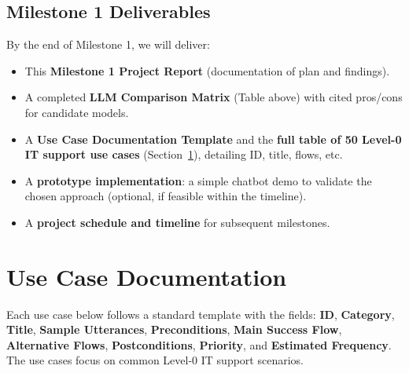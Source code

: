 \documentclass{article.cls}
\begin{document}
    \subsection{Milestone 1 Deliverables}
    By the end of Milestone 1, we will deliver:
    \begin{itemize}
        \item This \textbf{Milestone 1 Project Report} (documentation of plan and findings).
        \item A completed \textbf{LLM Comparison Matrix} (Table above) with cited pros/cons for candidate models.
        \item A \textbf{Use Case Documentation Template} and the \textbf{full table of 50 Level-0 IT support use cases} (Section~\ref{sec:usecases}), detailing ID, title, flows, etc.
        \item A \textbf{prototype implementation}: a simple chatbot demo to validate the chosen approach (optional, if feasible within the timeline).
        \item A \textbf{project schedule and timeline} for subsequent milestones.
    \end{itemize}

    \section{Use Case Documentation}
    \label{sec:usecases}
    Each use case below follows a standard template with the fields: \textbf{ID}, \textbf{Category}, \textbf{Title}, \textbf{Sample Utterances}, \textbf{Preconditions}, \textbf{Main Success Flow}, \textbf{Alternative Flows}, \textbf{Postconditions}, \textbf{Priority}, and \textbf{Estimated Frequency}. The use cases focus on common Level-0 IT support scenarios.
\end{document}
